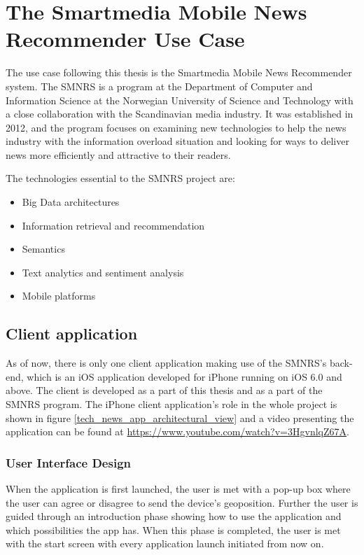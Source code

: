 \chapter{The Smartmedia Mobile News Recommender Use Case}

The use case following this thesis is the Smartmedia Mobile News Recommender system. The SMNRS is a program at the Department of Computer and Information Science at the Norwegian University of Science and Technology with a close collaboration with the Scandinavian media industry. It was established in 2012, and the program focuses on examining new technologies to help the news industry with the information overload situation and looking for ways to deliver news more efficiently and attractive to their readers.

The technologies essential to the SMNRS project are:

\begin{itemize}
	\item Big Data architectures
	\item Information retrieval and recommendation
	\item Semantics
	\item Text analytics and sentiment analysis
	\item Mobile platforms
\end{itemize}

\section{Client application}
As of now, there is only one client application making use of the SMNRS's back-end, which is an iOS application developed for iPhone running on iOS 6.0 and above. The client is developed as a part of this thesis and as a part of the SMNRS program. The iPhone client application's role in the whole project is shown in figure \ref{tech_news_app_architectural_view} and a video presenting the application can be found at \url{https://www.youtube.com/watch?v=3HgvnlqZ67A}.

\subsection{User Interface Design}
When the application is first launched, the user is met with a pop-up box where the user can agree or disagree to send the device's geoposition. Further the user is guided through an introduction phase showing how to use the application and which possibilities the app has. When this phase is completed, the user is met with the start screen with every application launch initiated from now on.

